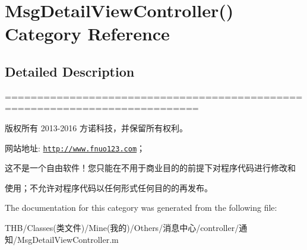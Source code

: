 \hypertarget{category_msg_detail_view_controller_07_08}{}\section{Msg\+Detail\+View\+Controller() Category Reference}
\label{category_msg_detail_view_controller_07_08}


\subsection{Detailed Description}
============================================================================

版权所有 2013-\/2016 方诺科技，并保留所有权利。

网站地址\+: \href{http://www.fnuo123.com}{\tt http\+://www.\+fnuo123.\+com}； 



这不是一个自由软件！您只能在不用于商业目的的前提下对程序代码进行修改和

使用；不允许对程序代码以任何形式任何目的的再发布。 

 

The documentation for this category was generated from the following file\+:\begin{DoxyCompactItemize}
\item 
T\+H\+B/\+Classes(类文件)/\+Mine(我的)/\+Others/消息中心/controller/通知/Msg\+Detail\+View\+Controller.\+m\end{DoxyCompactItemize}
